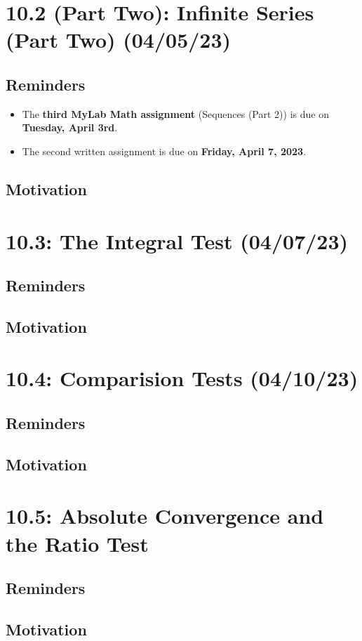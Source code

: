 \documentclass{report}
\begin{document}
\begin{sloppypar}
\chapter{10.2 (Part Two): Infinite Series (Part Two) (04/05/23)}
\section{Reminders}
\begin{itemize}
  \item The \textbf{third MyLab Math assignment} (Sequences
        (Part 2)) is due on \textbf{Tuesday, April 3rd}.
  \item The second written assignment is due on \textbf{
        Friday, April 7, 2023}.
\end{itemize}

\section{Motivation}
\chapter{10.3: The Integral Test (04/07/23)}
\section{Reminders}
\section{Motivation}
\chapter{10.4: Comparision Tests (04/10/23)}
\section{Reminders}
\section{Motivation}
\chapter{10.5: Absolute Convergence and the Ratio Test}
\section{Reminders}
\section{Motivation}

\end{sloppypar}
\end{document}
